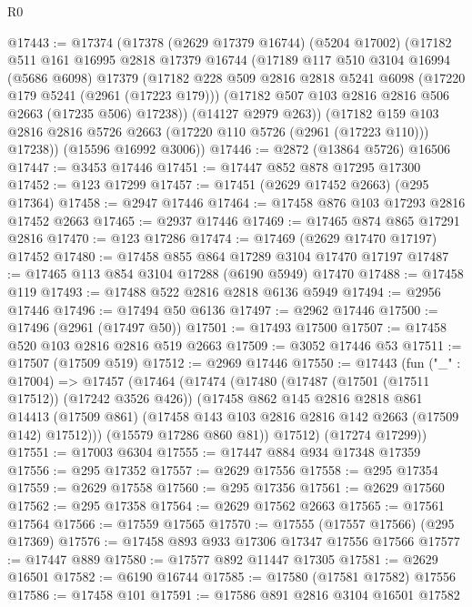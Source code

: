 \begin{lexlean}{R0}
\begin{coremodule}
@17443 := @17374
    (@17378
      (@2629 @17379 @16744)
      (@5204 @17002)
      (@17182
        @511
        @161
        @16995
        @2818
        @17379
        @16744
        (@17189
          @117
          @510
          @3104
          @16994
          (@5686 @6098)
          @17379
          (@17182
            @228
            @509
            @2816
            @2818
            @5241
            @6098
            (@17220 @179 @5241 (@2961 (@17223 @179)))
            (@17182 @507 @103 @2816 @2816 @506 @2663 (@17235 @506) @17238))
          (@14127 @2979 @263))
        (@17182 @159 @103 @2816 @2816 @5726 @2663 (@17220 @110 @5726 (@2961 (@17223 @110))) @17238))
      (@15596 @16992 @3006))
@17446 := @2872 (@13864 @5726) @16506
@17447 := @3453 @17446
@17451 := @17447 @852 @878 @17295 @17300
@17452 := @123 @17299
@17457 := @17451 (@2629 @17452 @2663) (@295 @17364)
@17458 := @2947 @17446
@17464 := @17458 @876 @103 @17293 @2816 @17452 @2663
@17465 := @2937 @17446
@17469 := @17465 @874 @865 @17291 @2816
@17470 := @123 @17286
@17474 := @17469 (@2629 @17470 @17197) @17452
@17480 := @17458 @855 @864 @17289 @3104 @17470 @17197
@17487 := @17465 @113 @854 @3104 @17288 (@6190 @5949) @17470
@17488 := @17458 @119
@17493 := @17488 @522 @2816 @2818 @6136 @5949
@17494 := @2956 @17446
@17496 := @17494 @50 @6136
@17497 := @2962 @17446
@17500 := @17496 (@2961 (@17497 @50))
@17501 := @17493 @17500
@17507 := @17458 @520 @103 @2816 @2816 @519 @2663
@17509 := @3052 @17446 @53
@17511 := @17507 (@17509 @519)
@17512 := @2969 @17446
@17550 := @17443
    (fun ("_" : @17004) =>
    @17457
      (@17464
        (@17474
          (@17480
            (@17487 (@17501 (@17511 @17512)) (@17242 @3526 @426))
            (@17458
              @862
              @145
              @2816
              @2818
              @861
              @14413
              (@17509 @861)
              (@17458 @143 @103 @2816 @2816 @142 @2663 (@17509 @142) @17512)))
          (@15579 @17286 @860 @81))
        @17512)
      (@17274 @17299))
@17551 := @17003 @6304
@17555 := @17447 @884 @934 @17348 @17359
@17556 := @295 @17352
@17557 := @2629 @17556
@17558 := @295 @17354
@17559 := @2629 @17558
@17560 := @295 @17356
@17561 := @2629 @17560
@17562 := @295 @17358
@17564 := @2629 @17562 @2663
@17565 := @17561 @17564
@17566 := @17559 @17565
@17570 := @17555 (@17557 @17566) (@295 @17369)
@17576 := @17458 @893 @933 @17306 @17347 @17556 @17566
@17577 := @17447 @889
@17580 := @17577 @892 @11447 @17305
@17581 := @2629 @16501
@17582 := @6190 @16744
@17585 := @17580 (@17581 @17582) @17556
@17586 := @17458 @101
@17591 := @17586 @891 @2816 @3104 @16501 @17582

\end{coremodule}
\end{lexlean}
